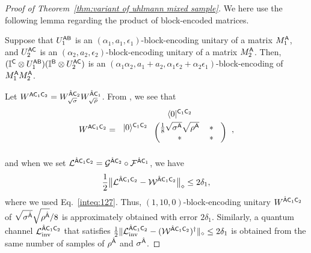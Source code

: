 \begin{proof}[Proof of Theorem~\ref{thm:variant of uhlmann mixed sample}]
 
We here use the following lemma regarding the product of block-encoded matrices.
\begin{lemma}
\label{lem:product of BE}
Suppose that $U_1^{{\mathsf{A}}{\mathsf{B}}}$ is an $(\alpha_1, a_1, \epsilon_1)$-block-encoding unitary of a matrix $M_1^{\mathsf{A}}$, and $U_2^{{\mathsf{A}}{\mathsf{C}}}$ is an $(\alpha_2, a_2, \epsilon_2)$-block-encoding unitary of a matrix $M_2^{\mathsf{A}}$. Then, $(\mathbb{I}^{\mathsf{C}}\otimes U_1^{{\mathsf{A}}{\mathsf{B}}})(\mathbb{I}^{\mathsf{B}} \otimes U_2^{{\mathsf{A}}{\mathsf{C}}})$ is an $(\alpha_1\alpha_2, a_1+a_2, \alpha_1\epsilon_2 + \alpha_2\epsilon_1)$-block-encoding of $M_1^{\mathsf{A}} M_2^{\mathsf{A}}$.
\end{lemma}

Let $W^{{\mathsf{A}}{\mathsf{C}}_1{\mathsf{C}}_2} = W_{\sqrt{\sigma}}^{\hat{{\mathsf{A}}}{\mathsf{C}}_2}W_{\sqrt{\rho}}^{\hat{{\mathsf{A}}}{\mathsf{C}}_1}$.
From , we see that
\begin{align}
    W^{\sA\sC_1\sC_2} 
    = 
\begin{blockarray}{ccc}
 & \bra{0}^{\sC_1\sC_2} &  & \vspace{1mm}\\
\begin{block}{c(cc)}
  \ket{0}^{\sC_1\sC_2} \hspace*{1mm} & \f{1}{8}\sqrt{\sigma^\sA}\sqrt{\rho^\sA} & \hspace{0mm} * \hspace{3mm}\\
   \hspace*{1mm} & * & \hspace{0mm} * \hspace{3mm}\\
\end{block}
\end{blockarray}\hspace{2.5mm},
\end{align}
and when we set ${\mathcal{L}}^{\hat{{\mathsf{A}}}{\mathsf{C}}_1{\mathsf{C}}_2} = {\mathcal{G}}^{\hat{{\mathsf{A}}}{\mathsf{C}}_2}\circ{\mathcal{F}}^{\hat{{\mathsf{A}}}{\mathsf{C}}_1}$, we have 
\begin{align}
\label{inteq:130}
    \frac{1}{2}\big\|{\mathcal{L}}^{\hat{{\mathsf{A}}}{\mathsf{C}}_1{\mathsf{C}}_2} - {\mathcal{W}}^{\hat{{\mathsf{A}}}{\mathsf{C}}_1{\mathsf{C}}_2}\big\|_\diamond \leq 2\delta_1,
\end{align}
where we used Eq.~\eqref{inteq:127}.
Thus, $(1,10,0)$-block-encoding unitary $W^{\hat{{\mathsf{A}}}{\mathsf{C}}_1{\mathsf{C}}_2}$ of $\sqrt{\sigma^{\hat{{\mathsf{A}}}}}\sqrt{\rho^{\hat{{\mathsf{A}}}}}/8$ is approximately obtained with error $2\delta_1$.
Similarly, a quantum channel ${\mathcal{L}}_{\rm inv}^{\hat{{\mathsf{A}}}{\mathsf{C}}_1{\mathsf{C}}_2}$ that satisfies $\frac{1}{2}\|{\mathcal{L}}_{\rm inv}^{\hat{{\mathsf{A}}}{\mathsf{C}}_1{\mathsf{C}}_2} - ({\mathcal{W}}^{\hat{{\mathsf{A}}}{\mathsf{C}}_1{\mathsf{C}}_2})^\dag\|_\diamond \leq 2\delta_1$ is obtained from the same number of samples of $\rho^{\hat{{\mathsf{A}}}}$ and $\sigma^{\hat{{\mathsf{A}}}}$.



\end{proof}
